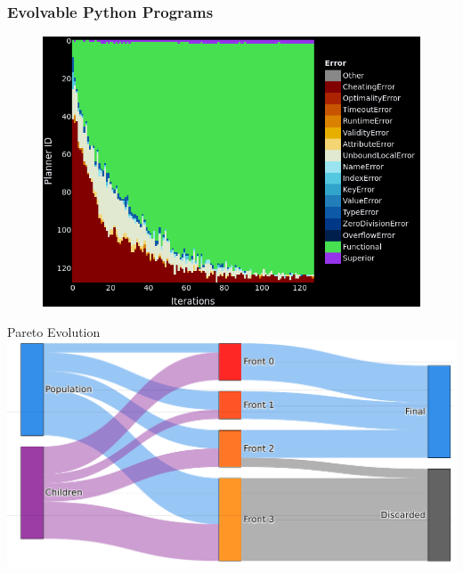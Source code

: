 \documentclass[aspectratio=169]{beamer}
\begin{document}
\begin{frame}[fragile]\frametitle{Evolvable Python Programs}
\vspace{-0.1cm}
\begin{figure}
    \centering
    \includegraphics[height=0.9\textheight, keepaspectratio]{figures/iterative_mutation.png}
\end{figure}
\end{frame}

\begin{frame}{Pareto Evolution}
    \includegraphics[width=1.0\linewidth, keepaspectratio]{figures/paretoev.pdf}
\end{frame}
\end{document}
